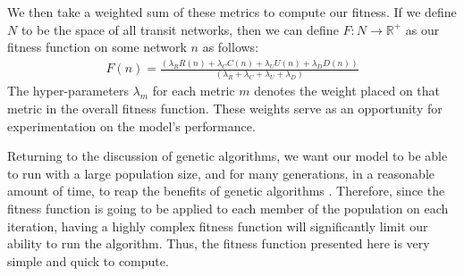 \documentclass[11pt]{amsart}
\theoremstyle{definition}                  %
\theoremstyle{remark}                       %
\numberwithin{equation}{section}
\begin{document}
We then take a weighted sum of these metrics to compute our fitness. If we define $N$ to be the space of all transit networks, then we can define $F: N \to \mathbb{R}^{+}$ as our fitness function on some network $n$ as follows:
\begin{align*}
    F(n) = \frac{(\lambda_{R} R(n) + \lambda_{C} C(n) + \lambda_{U} U(n) + \lambda_{D} D(n))}{(\lambda_{R} + \lambda_{C} + \lambda_{U} + \lambda_{D})}
\end{align*}
The hyper-parameters $\lambda_{m}$ for each metric $m$ denotes the weight placed on that metric in the overall fitness function. These weights serve as an opportunity for experimentation on the model's performance. 

Returning to the discussion of genetic algorithms, we want our model to be able to run with a large population size, and for many generations, in a reasonable amount of time, to reap the benefits of genetic algorithms \cite{mitchell1998}. Therefore, since the fitness function is going to be applied to each member of the population on each iteration, having a highly complex fitness function will significantly limit our ability to run the algorithm. Thus, the fitness function presented here is very simple and quick to compute. 
\end{document}
